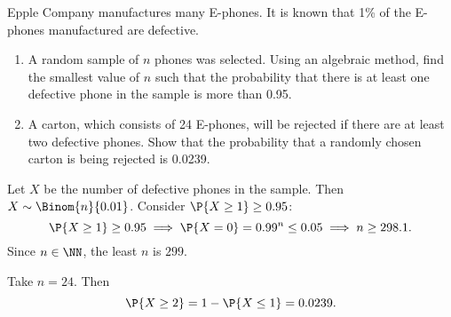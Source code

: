 \begin{problem}
    Epple Company manufactures many E-phones. It is known that 1\% of the E-phones manufactured are defective.
    \begin{enumerate}
        \item A random sample of $n$ phones was selected. Using an algebraic method, find the smallest value of $n$ such that the probability that there is at least one defective phone in the sample is more than 0.95.
        \item A carton, which consists of 24 E-phones, will be rejected if there are at least two defective phones. Show that the probability that a randomly chosen carton is being rejected is 0.0239.
    \end{enumerate}
\end{problem}
\begin{solution}
    \begin{ppart}
        Let $X$ be the number of defective phones in the sample. Then $X \sim \Binom{n}{0.01}$. Consider $\P{X \geq 1} \geq 0.95$: \[\P{X \geq 1} \geq 0.95 \implies \P{X = 0} = 0.99^n \leq 0.05 \implies n \geq 298.1.\] Since $n \in \NN$, the least $n$ is $299$.
    \end{ppart}
    \begin{ppart}
        Take $n = 24$. Then \[\P{X \geq 2} = 1- \P{X \leq 1} = 0.0239.\]
    \end{ppart}
\end{solution}

